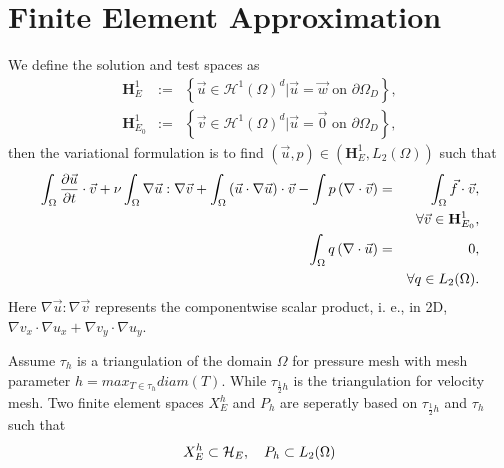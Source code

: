 \documentclass[a4paper, 11pt]{article}
\begin{document}
\section{Finite Element Approximation}
    We define the solution and test spaces as
    \begin{eqnarray}
      \mathbf{H}_E^1 & := & \left\{ \vec{u} \in \mathcal{H}^1(\Omega)^d \big|
        \vec{u} = \vec{w} \mbox{ on } \partial \Omega_D \right\},\\
      \mathbf{H}_{E_0}^1 & := & \left\{ \vec{v} \in \mathcal{H}^1(\Omega)^d \big|
        \vec{u} = \vec{0} \mbox{ on } \partial \Omega_D \right\},
    \end{eqnarray}
    then the variational formulation is to find  $(\vec{u}, p) \in
   (\mathbf{H}_E^1, L_2(\Omega))$ such that
   \begin{eqnarray}
     \int_{\Omega}\frac{\partial \vec{u}}{\partial t} \cdot \vec{v} + 
     \nu \int_\Omega \nabla \vec{u} : \nabla \vec{v} + \int_\Omega \left(
       \vec{u} \cdot \nabla \vec{u} \right) \cdot \vec{v} - \int p
     \left( \nabla \cdot \vec{v} \right) & = & \int_\Omega \vec{f} \cdot
     \vec{v}, \label{eq::generalweak_momentum}\\
     & & \forall \vec{v} \in \mathbf{H}_{E_0}^1,\notag \\
     \int_\Omega q \left( \nabla \cdot \vec{u} \right) & = & 0,
     \label{eq::generalweak_mass} \\
     & & \forall q \in L_2(\Omega). \notag
   \end{eqnarray}
   Here $\nabla \vec{u} : \nabla \vec{v}$ represents the componentwise
   scalar product, i. e., in 2D, $\nabla v_x \cdot \nabla u_x + \nabla
   v_y \cdot \nabla u_y$.

   Assume $\tau_h$ is a triangulation of the domain $\Omega$ for
   pressure mesh with mesh parameter $h = max_{T \in \tau_h} diam(T)$.
   While $\tau_{\frac{1}{2}h}$ is the triangulation for velocity mesh.
   Two finite element spaces $X_E^h$ and $P_h$ are seperatly based on
   $\tau_{\frac{1}{2}h}$ and $\tau_h$ such that
   \begin{equation}
     X_E^h \subset \mathcal{H}_E, \quad P_h \subset L_2(\Omega) 
     \notag 
   \end{equation}
   
\end{document}
